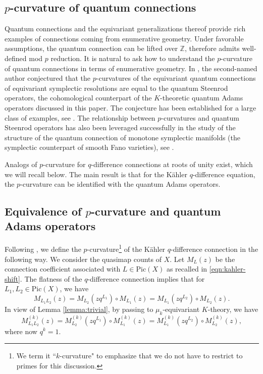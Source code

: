 \documentclass[reqno]{amsart}
\numberwithin{equation}{section}
\numberwithin{equation}{section}
\numberwithin{equation}{section}
\theoremstyle{definition}
\theoremstyle{remark}
\theoremstyle{remark}
\begin{document}
\subsection{$p$-curvature of quantum connections}
Quantum connections and the equivariant generalizations thereof provide rich examples of connections coming from enumerative geometry. Under favorable assumptions, the quantum connection can be lifted over $\mathbb{Z}$, therefore admits well-defined mod $p$ reduction. It is natural to ask how to understand the $p$-curvature of quantum connections in terms of enumerative geometry. In \cite{Lee23b}, the second-named author conjectured that the $p$-curvatures of the equivariant quantum connections of equivariant symplectic resolutions are equal to the quantum Steenrod operators, the cohomological counterpart of the $K$-theoretic quantum Adams operators discussed in this paper. The conjecture has been established for a large class of examples, see \cite[Theorem 1.2, Remark 1.4]{Lee23b}. The relationship between $p$-curvatures and quantum Steenrod operators has also been leveraged successfully in the study of the structure of the quantum connection of monotone symplectic manifolds (the symplectic counterpart of smooth Fano varieties), see \cite{chen2024exponential}.

Analogs of $p$-curvature for $q$-difference connections at roots of unity exist, which we will recall below. The main result is that for the K\"ahler $q$-difference equation, the $p$-curvature can be identified with the quantum Adams operators.

\subsection{Equivalence of $p$-curvature and quantum Adams operators}
Following \cite{koroteev-smirnov}, we define the $p$-curvature\footnote{We term it ``$k$-curvature" to emphasize that we do not have to restrict to primes for this discussion.} of the K\"ahler $q$-difference connection in the following way. We consider the quasimap counts of $X$. Let $M_L(z)$ be the connection coefficient associated with $L \in \mathrm{Pic}(X)$ as recalled in \eqref{eqn:kahler-shift}. The flatness of the $q$-difference connection implies that for $L_1, L_2 \in \mathrm{Pic}(X)$, we have
\begin{equation}
    M_{L_1 L_2}(z) = M_{L_2}(zq^{L_1}) \circ M_{L_1}(z) = M_{L_1}(zq^{L_2}) \circ M_{L_2}(z).
\end{equation}
In view of Lemma \ref{lemma:trivial}, by passing to $\mu_k$-equivariant $K$-theory, we have
\begin{equation}\label{eqn:flat}
    M_{L_1 L_2}^{(k)}(z) = M_{L_2}^{(k)}(zq^{L_1}) \circ M_{L_1}^{(k)}(z) = M_{L_1}^{(k)}(zq^{L_2}) \circ M_{L_2}^{(k)}(z),
\end{equation}
where now $q^k = 1$.
\end{document}
